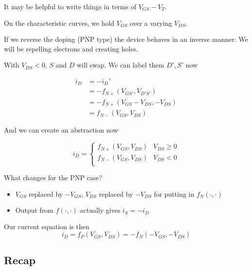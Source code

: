 \documentclass{report}
\begin{document}
It may be helpful to write things in terms of $V_{GS} - V_T$.

On the characteristic curves, we hold $V_{GS}$ over a varying $V_{DS}$.

If we reverse the doping (PNP type) the device behaves in an inverse manner: We will be repelling electrons and creating holes.

With $V_{DS} < 0$, $S$ and $D$ will swap. We can label them $D', S'$ now


\begin{align*}
    i_D 
    &= - i_D' \\
    &= - f_{N+}(V_{GS'}, V_{D'S'}) \\
    &= - f_{N+}(V_{GS} - V_{DS}, -V_{DS}) \\
    &= f_{N-}(V_{GS}, V_{DS})
\end{align*}

And we can create an abstraction now

\begin{equation*}
    i_D = 
    \begin{cases}
        f_{N+}(V_{GS}, V_{DS}) & V_{DS} \geq 0 \\
        f_{N-}(V_{GS}, V_{DS}) & V_{DS} < 0 \\
    \end{cases}
\end{equation*}

What changes for the PNP case?
\begin{itemize}
    \item $V_{GS}$ replaced by $- V_{GS}$, $V_{DS}$ replaced by $- V_{DS}$ for putting in $f_N(\cdot, \cdot)$
    \item Output from $f(\cdot, \cdot)$ actually gives $i_S = - i_D$
\end{itemize}

Our current equation is then
\begin{equation*}
    i_D = f_P(V_{GS}, V_{DS}) = - f_N (-V_{GS}, -V_{DS})
\end{equation*}

\subsection{Recap}
\end{document}
